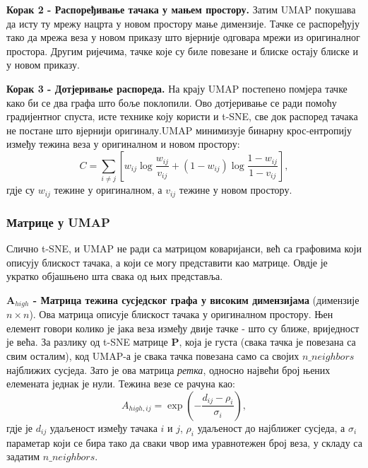 \documentclass{article}
\begin{document}
	\textbf{Корак 2 - Распоређивање тачака у мањем простору.} Затим UMAP покушава да исту ту мрежу нацрта у новом простору мање димензије. Тачке се распоређују тако да мрежа веза у новом приказу што вјерније одговара мрежи из оригиналног простора. Другим ријечима, тачке које су биле повезане и блиске остају блиске и у новом приказу.
	
	\textbf{Корак 3 - Дотјеривање распореда.} На крају UMAP постепено помјера тачке како би се два графа што боље поклопили. Ово дотјеривање се ради помоћу градијентног спуста, исте технике коју користи и t-SNE, све док распоред тачака не постане што вјернији оригиналу.UMAP минимизује бинарну крос-ентропију између тежина веза у оригиналном и новом простору:
	\begin{equation} \label{eq:umap_loss}
		C = \sum_{i \neq j} \left[ w_{ij} \log\frac{w_{ij}}{v_{ij}} + (1 - w_{ij}) \log\frac{1 - w_{ij}}{1 - v_{ij}} \right],
	\end{equation}
	гдје су $w_{ij}$ тежине у оригиналном, а $v_{ij}$ тежине у новом простору.
	
	
	\subsubsection{Матрице у UMAP}
	
	Слично t-SNE, и UMAP не ради са матрицом коваријанси, већ са графовима који описују блискост тачака, а који се могу представити као матрице. Овдје је укратко објашњено шта свака од њих представља.
	
	\textbf{$\mathbf{A}_{high}$ - Матрица тежина сусједског графа у високим димензијама} (димензије $n \times n$). Ова матрица описује блискост тачака у оригиналном простору. Њен елемент говори колико је јака веза између двије тачке - што су ближе, вриједност је већа. За разлику од t-SNE матрице $\mathbf{P}$, која је густа (свака тачка је повезана са свим осталим), код UMAP-а је свака тачка повезана само са својих $n\_neighbors$ најближих сусједа. Зато је ова матрица \textit{ретка}, односно највећи број њених елемената једнак је нули. Тежина везе се рачуна као:
	\begin{equation} \label{eq:umap_ahigh}
		A_{high,ij} = \exp\!\left(-\frac{d_{ij} - \rho_i}{\sigma_i}\right),
	\end{equation}
	гдје је $d_{ij}$ удаљеност између тачака $i$ и $j$, $\rho_i$ удаљеност до најближег сусједа, а $\sigma_i$ параметар који се бира тако да сваки чвор има уравнотежен број веза, у складу са задатим $n\_neighbors$.
	
\end{document}
